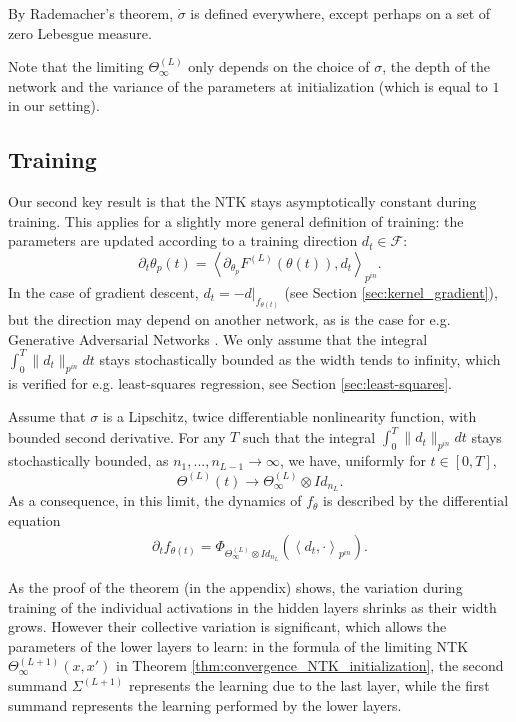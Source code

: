 \begin{rem}
By Rademacher's theorem, $\dot{\sigma}$ is defined everywhere, except perhaps on a set of zero Lebesgue measure.
\end{rem}

Note that the limiting $\Theta^{(L)}_\infty$ only depends on the choice of $\sigma$, the depth of the network and the variance of the parameters at initialization (which is equal to $1$ in our setting).

\subsection{Training}
Our second key result is that the NTK stays asymptotically constant during training. This applies for a slightly more general definition of training: the parameters are updated according to a training direction $d_t \in \mathcal{F}$:
$$
\partial_t \theta_p(t) = \left< \partial_{\theta_p} F^{(L)}(\theta(t)), d_t \right>_{p^{in}}.
$$
In the case of gradient descent, $d_t = -d|_{f_{\theta(t)}}$ (see Section \ref{sec:kernel_gradient}), but the direction may depend on another network, as is the case for e.g. Generative Adversarial Networks \cite{Goodfellow2014}. We only assume that the integral $\int_0^T \| d_t \|_{p^{in}} dt$ stays stochastically bounded as the width tends to infinity, which is verified for e.g. least-squares regression, see Section \ref{sec:least-squares}.

\begin{thm}\label{thm:conv-ntk-training}

Assume that $ \sigma $ is a Lipschitz, twice differentiable nonlinearity function, with bounded second derivative. For any $T$ such that the integral $\int_0^T \| d_t \|_{p^{in}} dt$ stays stochastically bounded, as  $n_1, ..., n_{L-1} \to \infty$, we have, uniformly for $t\in[0, T]$, $$
\Theta^{(L)}(t) \to \Theta^{(L)}_\infty \otimes Id_{n_L}. $$ As a consequence, in this limit, the dynamics of $f_\theta$ is described by the differential equation
\begin{align*}
    \partial_t f_{\theta(t)} = \Phi_{\Theta^{(L)}_\infty \otimes Id_{n_L}} \left( \left<d_{t}, \cdot \right>_{p^{in}} \right).
\end{align*}
\end{thm}

\begin{rem}
As the proof of the theorem (in the appendix) shows, the variation during training of the individual activations in the hidden layers shrinks as their width grows. However their collective variation is significant, which allows the parameters of the lower layers to learn: in the formula of the limiting NTK  $\Theta^{(L+1)}_\infty(x, x')$ in Theorem \ref{thm:convergence_NTK_initialization}, the second summand $\Sigma^{(L+1)}$ represents the learning due to the last layer, while the first summand represents the learning performed by the lower layers. 
\end{rem}

